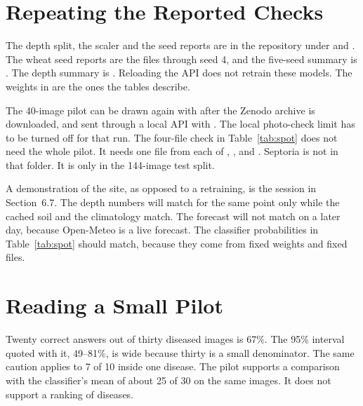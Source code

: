 \section{Repeating the Reported Checks}
The depth split, the scaler and the seed reports are in the repository under  and . The wheat seed reports are the files  through seed 4, and the five-seed summary is . The depth summary is . Reloading the API does not retrain these models. The weights in  are the ones the tables describe.

The 40-image pilot can be drawn again with  after the Zenodo archive is downloaded, and sent through a local API with . The local photo-check limit has to be turned off for that run. The four-file check in Table~\ref{tab:spot} does not need the whole pilot. It needs one file from each of , ,  and . Septoria is not in that folder. It is only in the 144-image test split.

A demonstration of the site, as opposed to a retraining, is the session in Section~6.7. The depth numbers will match for the same point only while the cached soil and the climatology match. The forecast will not match on a later day, because Open-Meteo is a live forecast. The classifier probabilities in Table~\ref{tab:spot} should match, because they come from fixed weights and fixed files.

\section{Reading a Small Pilot}
Twenty correct answers out of thirty diseased images is 67\%. The 95\% interval quoted with it, 49--81\%, is wide because thirty is a small denominator. The same caution applies to 7 of 10 inside one disease. The pilot supports a comparison with the classifier's mean of about 25 of 30 on the same images. It does not support a ranking of diseases.
